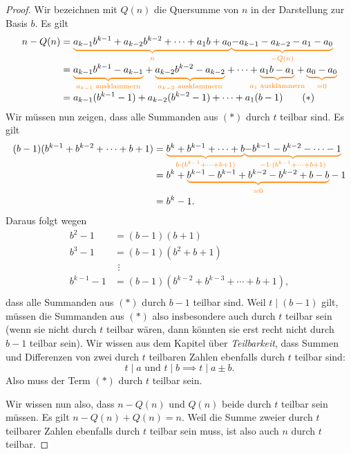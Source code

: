 \documentclass[../../main.tex]{subfiles}
\begin{document}
\begin{proof}
    Wir bezeichnen mit $Q(n)$ die Quersumme von $n$ in der Darstellung zur Basis $b$. Es gilt
    \begin{align*}
        n-Q(n)&=\colorbrace{a_{k-1}b^{k-1}+a_{k-2}b^{k-2}+\dots+a_1b+a_0}{n}\colorbrace{-a_{k-1}-a_{k-2}-a_1-a_0}{-Q(n)}\\
        &=\colorbrace{a_{k-1}b^{k-1}-a_{k-1}}{a_{k-1}\text{ ausklammern}}+\colorbrace{a_{k-2}b^{k-2}-a_{k-2}}{a_{k-2}\text{ ausklammern}}+\dots+\colorbrace{a_1b-a_1}{a_1\text{ ausklammern}}+\colorbrace{a_0-a_0}{=0}\\
        &=a_{k-1}(b^{k-1}-1)+a_{k-2}(b^{k-2}-1)+\dots+a_1(b-1)\tag{$*$}
    \end{align*}
    Wir müssen nun zeigen, dass alle Summanden aus $(*)$ durch $t$ teilbar sind. Es gilt
    \begin{align*}
        (b-1)(b^{k-1}+b^{k-2}+\cdots+b+1)
        &=\colorbrace{b^k+b^{k-1}+\cdots+b}{b\cdot(b^{k-1}+\cdots+b+1)}\colorbrace{-b^{k-1}-b^{k-2}-\cdots-1}{-1\cdot(b^{k-1}+\cdots+b+1)}\\
        &=b^k+\colorbrace{b^{k-1}-b^{k-1}+b^{k-2}-b^{k-2}+b-b}{=0}-1\\
        &=b^k-1.
    \end{align*}
    Daraus folgt wegen
    \begin{align*}
        b^2-1&=(b-1)(b+1)\\
        b^3-1&=(b-1)(b^2+b+1)\\
        &~\,\vdots\\
        b^{k-1}-1&=(b-1)(b^{k-2}+b^{k-3}+\cdots+b+1),\\
    \end{align*}
    dass alle Summanden aus $(*)$ durch $b-1$ teilbar sind. Weil $t\mid(b-1)$ gilt, müssen die Summanden aus $(*)$ also insbesondere auch durch $t$ teilbar sein (wenn sie nicht durch $t$ teilbar wären, dann könnten sie erst recht nicht durch $b-1$ teilbar sein). Wir wissen aus dem Kapitel über \emph{Teilbarkeit}, dass Summen und Differenzen von zwei durch $t$ teilbaren Zahlen ebenfalls durch $t$ teilbar sind:
    \[t\mid a\text{ und }t\mid b\implies t\mid a\pm b.\] 
    Also muss der Term $(*)$ durch $t$ teilbar sein. 
    
    Wir wissen nun also, dass $n-Q(n)$ und $Q(n)$ beide durch $t$ teilbar sein müssen. Es gilt $n-Q(n)+Q(n)=n$. Weil die Summe zweier durch $t$ teilbarer Zahlen ebenfalls durch $t$ teilbar sein muss, ist also auch $n$ durch $t$ teilbar.
\end{proof}
\end{document}
